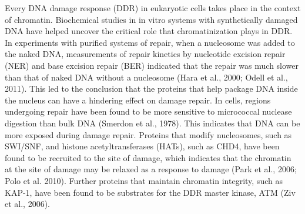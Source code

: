 Every DNA damage response (DDR) in eukaryotic cells takes place in the context of chromatin. Biochemical studies in in vitro systems with synthetically damaged DNA have helped uncover the critical role that chromatinization plays in DDR. In experiments with purified systems of repair, when a nucleosome was added to the naked DNA, measurements of repair kinetics by nucleotide excision repair (NER) and base excision repair (BER) indicated that the repair was much slower than that of naked DNA without a nucleosome (Hara et al., 2000; Odell et al., 2011). This led to the conclusion that the proteins that help package DNA inside the nucleus can have a hindering effect on damage repair. In cells, regions undergoing repair have been found to be more sensitive to micrococcal nuclease digestion than bulk DNA (Smerdon et al., 1978). This indicates that DNA can be more exposed during damage repair. Proteins that modify nucleosomes, such as SWI/SNF, and histone acetyltransferases (HATs), such as CHD4, have been found to be recruited to the site of damage, which indicates that the chromatin at the site of damage may be relaxed as a response to damage (Park et al., 2006; Polo et al. 2010). Further proteins that maintain chromatin integrity, such as KAP-1, have been found to be substrates for the DDR master kinase, ATM (Ziv et al., 2006).

